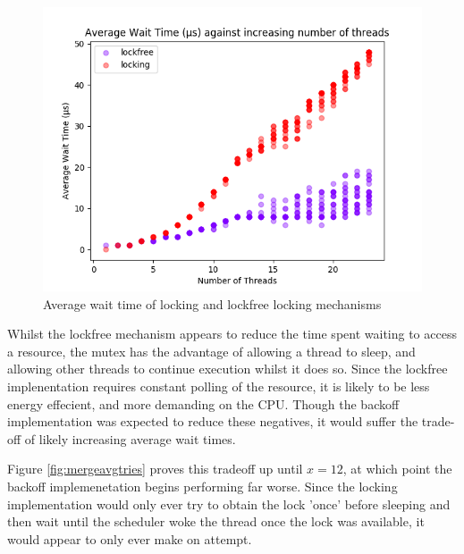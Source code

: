 \documentclass[12pt]{article}
\begin{document}
\begin{figure}[!h]
  \centering
  \includegraphics[width=0.8\linewidth]{images/omittedAverageWait}
	\caption{Average wait time of locking and lockfree locking mechanisms}
  \label{fig:omittedavgwait}
\end{figure}

Whilst the lockfree mechanism appears to reduce the time spent waiting to access a resource, the mutex has the advantage of allowing a thread to sleep, and allowing other threads to continue execution whilst it does so. Since the lockfree implenentation requires constant polling of the resource, it is likely to be less energy effecient, and more demanding on the CPU. Though the backoff implementation was expected to reduce these negatives, it would suffer the trade-off of likely increasing average wait times.

Figure \ref{fig:mergeavgtries} proves this tradeoff up until $x = 12$, at which point the backoff implemenetation begins performing far worse. Since the locking implementation would only ever try to obtain the lock 'once' before sleeping and then wait until the scheduler woke the thread once the lock was available, it would appear to only ever make on attempt. 
\end{document}
